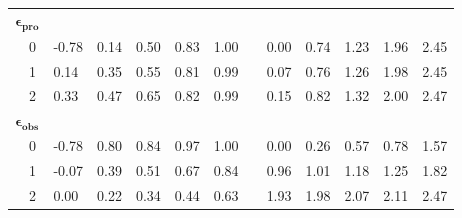 \documentclass[letterpaper,12pt,oneside]{article}\usepackage[]{graphicx}\usepackage[]{color}
\begin{document}
\begin{table}[h]
\begin{center}
\begin{tabular}{llllllclllll}
\hline
{\bfseries $\boldsymbol{\epsilon_{pro}}$}&&&&&&&&&&&\tabularnewline
~~0&-0.78&0.14&0.50&0.83&1.00&&0.00&0.74&1.23&1.96&2.45\tabularnewline
~~1& 0.14&0.35&0.55&0.81&0.99&&0.07&0.76&1.26&1.98&2.45\tabularnewline
~~2& 0.33&0.47&0.65&0.82&0.99&&0.15&0.82&1.32&2.00&2.47\tabularnewline
\hline
{\bfseries $\boldsymbol{\epsilon_{obs}}$}&&&&&&&&&&&\tabularnewline
~~0&-0.78&0.80&0.84&0.97&1.00&&0.00&0.26&0.57&0.78&1.57\tabularnewline
~~1&-0.07&0.39&0.51&0.67&0.84&&0.96&1.01&1.18&1.25&1.82\tabularnewline
~~2& 0.00&0.22&0.34&0.44&0.63&&1.93&1.98&2.07&2.11&2.47\tabularnewline
\hline
\end{tabular}
\end{center}
\end{table}



%
\end{document}
